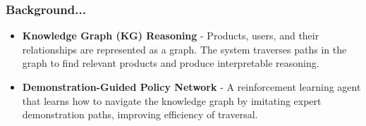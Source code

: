 \begin{frame}
\frametitle{Background...}

\begin{itemize}

    \item \textbf{Knowledge Graph (\textbf{KG}) Reasoning} - Products, users, and their relationships are represented as a graph. The system traverses paths in the graph to find relevant products and produce interpretable reasoning.

    \item \textbf{Demonstration-Guided Policy Network} - A reinforcement learning agent that learns how to navigate the knowledge graph by imitating expert demonstration paths, improving efficiency of traversal.


\end{itemize}

\end{frame}
